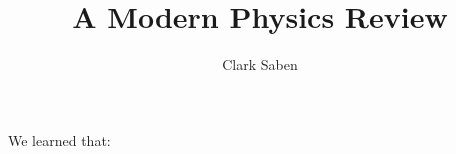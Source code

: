 \documentclass{article}
\title{A Modern Physics Review}
\author{Clark Saben}
\begin{document}
\newcommand{\pz}{\ket{\vb{+z}}}
\newcommand{\nz}{\ket{\vb{-z}}}
\newcommand{\px}{\ket{\vb{+x}}}
\newcommand{\nx}{\ket{\vb{-x}}}
\newcommand{\py}{\ket{\vb{+z}}}
\newcommand{\ny}{\ket{\vb{-y}}}

\newcommand{\pxexpr}{ \frac{1}{\sqrt{2}} \pz + \frac{1}{\sqrt{2}} \nz}
\newcommand{\nxexpr}{ \frac{1}{\sqrt{2}} \pz - \frac{1}{\sqrt{2}} \nz}
\newcommand{\pyexpr}{ \frac{1}{\sqrt{2}} \pz + \frac{i}{\sqrt{2}} \nz}
\newcommand{\nyexpr}{ \frac{1}{\sqrt{2}} \pz - \frac{i}{\sqrt{2}} \nz}
\maketitle


We learned that:




\end{document}
